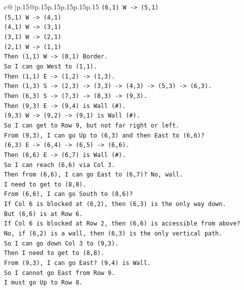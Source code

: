 \documentclass{article}
\begin{document}
{\begin{supertabular}{c@{$\;$}|p{.15\linewidth}@{}p{.15\linewidth}p{.15\linewidth}p{.15\linewidth}p{.15\linewidth}p{.15\linewidth}}
{{{\texttt{(6,1) W {-}> (5,1)} \\
\texttt{(5,1) W {-}> (4,1)} \\
\texttt{(4,1) W {-}> (3,1)} \\
\texttt{(3,1) W {-}> (2,1)} \\
\texttt{(2,1) W {-}> (1,1)} \\
\texttt{Then (1,1) W {-}> (0,1) Border.} \\
\texttt{So I can go West to (1,1).} \\
\texttt{Then (1,1) E {-}> (1,2) {-}> (1,3).} \\
\texttt{Then (1,3) S {-}> (2,3) {-}> (3,3) {-}> (4,3) {-}> (5,3) {-}> (6,3).} \\
\texttt{Then (6,3) S {-}> (7,3) {-}> (8,3) {-}> (9,3).} \\
\texttt{Then (9,3) E {-}> (9,4) is Wall (\#).} \\
\texttt{(9,3) W {-}> (9,2) {-}> (9,1) is Wall (\#).} \\
\texttt{So I can get to Row 9, but not far right or left.} \\
\texttt{From (9,3), I can go Up to (6,3) and then East to (6,6)?} \\
\texttt{(6,3) E {-}> (6,4) {-}> (6,5) {-}> (6,6).} \\
\texttt{Then (6,6) E {-}> (6,7) is Wall (\#).} \\
\texttt{So I can reach (6,6) via Col 3.} \\
\texttt{Then from (6,6), I can go East to (6,7)? No, wall.} \\
\texttt{I need to get to (8,8).} \\
\texttt{From (6,6), I can go South to (8,6)?} \\
\texttt{If Col 6 is blocked at (6,2), then (6,3) is the only way down.} \\
\texttt{But (6,6) is at Row 6.} \\
\texttt{If Col 6 is blocked at Row 2, then (6,6) is accessible from above?} \\
\texttt{No, if (6,2) is a wall, then (6,3) is the only vertical path.} \\
\texttt{So I can go down Col 3 to (9,3).} \\
\texttt{Then I need to get to (8,8).} \\
\texttt{From (9,3), I can go East? (9,4) is Wall.} \\
\texttt{So I cannot go East from Row 9.} \\
\texttt{I must go Up to Row 8.} \\
}}}
\end{supertabular}}
\end{document}
